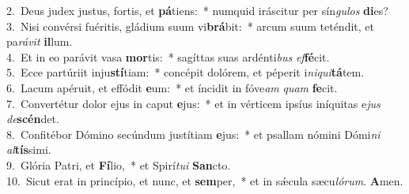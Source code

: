 {2.~}Deus judex justus, fortis, et \textbf{pá}tiens:~* numquid iráscitur per sín\textit{gu}\textit{los} \textbf{di}es?\\
{3.~}Nisi convérsi fuéritis, gládium suum vi\textbf{brá}bit:~* arcum suum teténdit, et pa\textit{rá}\textit{vit} \textbf{il}lum.\\
{4.~}Et in eo parávit vasa \textbf{mor}tis:~* sagíttas suas ardénti\textit{bus} \textit{ef}\textbf{fé}cit.\\
{5.~}Ecce partúriit inju\textbf{stí}tiam:~* concépit dolórem, et péperit i\textit{ni}\textit{qui}\textbf{tá}tem.\\
{6.~}Lacum apéruit, et effódit \textbf{e}um:~* et íncidit in fóve\textit{am} \textit{quam} \textbf{fe}cit.\\
{7.~}Convertétur dolor ejus in caput \textbf{e}jus:~* et in vérticem ipsíus iníquitas e\textit{jus} \textit{de}\textbf{scén}det.\\
{8.~}Confitébor Dómino secúndum justítiam \textbf{e}jus:~* et psallam nómini Dómi\textit{ni} \textit{al}\textbf{tís}simi.\\
{9.~}Glória Patri, et \textbf{Fí}lio,~* et Spirí\textit{tu}\textit{i} \textbf{San}cto.\\
{10.~}Sicut erat in princípio, et nunc, et \textbf{sem}per,~* et in sǽcula sæcu\textit{ló}\textit{rum}. \textbf{A}men.\\
